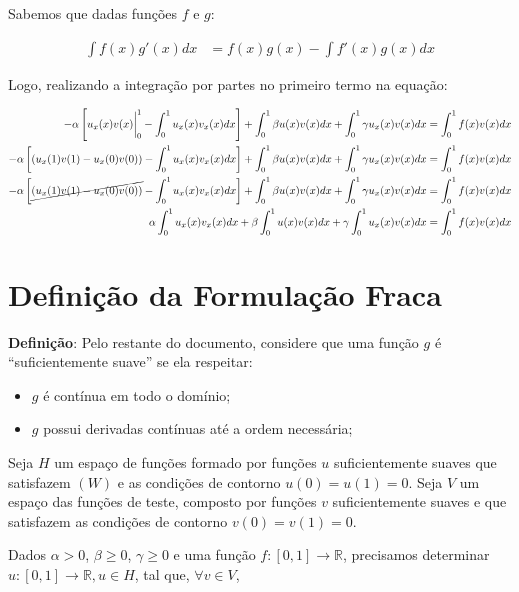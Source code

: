 Sabemos que dadas funções $f$ e $g$:

\begin{align*}
  \int f(x)g'(x)dx &= f(x)g(x) - \int f'(x)g(x)dx
\end{align*}

Logo, realizando a integração por partes no primeiro termo na equação:

\begin{align*}
-\alpha \left[u_{x}(x)v(x) \bigg|^{1}_{0} - \int^{1}_{0} u_{x}(x)v_{x}(x) dx\right] + \int^{1}_{0} \beta u(x)v(x) dx + \int^{1}_{0} \gamma u_{x}(x)v(x) dx &= \int^{1}_{0} f(x)v(x) dx\\
-\alpha \left[(u_{x}(1)v(1) - u_{x}(0)v(0)) - \int^{1}_{0} u_{x}(x)v_{x}(x) dx\right] + \int^{1}_{0} \beta u(x)v(x) dx + \int^{1}_{0} \gamma u_{x}(x)v(x) dx &= \int^{1}_{0} f(x)v(x) dx\\
-\alpha \left[\cancel{(u_{x}(1)v(1) - u_{x}(0)v(0))} - \int^{1}_{0} u_{x}(x)v_{x}(x) dx\right] + \int^{1}_{0} \beta u(x)v(x) dx + \int^{1}_{0} \gamma u_{x}(x)v(x) dx  &= \int^{1}_{0} f(x)v(x) dx\\
\alpha \int^{1}_{0} u_{x}(x)v_{x}(x) dx + \beta \int^{1}_{0} u(x)v(x) dx + \gamma \int^{1}_{0} u_{x}(x)v(x) dx &= \int^{1}_{0} f(x)v(x) dx\\
\end{align*}

\section{Definição da Formulação Fraca}

  \textbf{Definição}: Pelo restante do documento, considere que uma função $g$ é ``suficientemente suave'' se ela respeitar:

  \begin{itemize}
    \item $g$ é contínua em todo o domínio;
    \item $g$ possui derivadas contínuas até a ordem necessária;
  \end{itemize}

Seja $H$ um espaço de funções formado por funções $u$ suficientemente suaves que satisfazem $(W)$ e as condições de contorno $u(0) = u(1) = 0$. Seja $V$ um espaço das funções de teste, composto por funções $v$ suficientemente suaves e que satisfazem as condições de contorno $v(0) = v(1) = 0$.

Dados $\alpha > 0$, $\beta \geq 0$, $\gamma \geq 0$ e uma função $f : [0,1] \to \mathbb{R}$, precisamos determinar $u : [0,1] \to \mathbb{R}, u \in H$, tal que, $\forall v \in V$,

